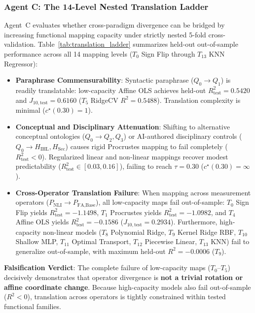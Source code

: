 \subsubsection{Agent C: The 14-Level Nested Translation Ladder}

Agent~C evaluates whether cross-paradigm divergence can be bridged by increasing functional mapping capacity under strictly nested 5-fold cross-validation. Table~\ref{tab:translation_ladder} summarizes held-out out-of-sample performance across all 14 mapping levels ($T_0$ Sign Flip through $T_{13}$ KNN Regressor):
\begin{itemize}
    \item \textbf{Paraphrase Commensurability}: Syntactic paraphrase ($Q_0 \to Q_1$) is readily translatable: low-capacity Affine OLS achieves held-out $R^2_{\text{test}} = 0.5420$ and $J_{10,\text{test}} = 0.6160$ ($T_5$ RidgeCV $R^2 = 0.5488$). Translation complexity is minimal ($c^\star(0.30) = 1$).
    \item \textbf{Conceptual and Disciplinary Attenuation}: Shifting to alternative conceptual ontologies ($Q_0 \to Q_2, Q_3$) or AI-authored disciplinary controls ($Q_0 \to H_{\text{IHL}}, H_{\text{Sec}}$) causes rigid Procrustes mapping to fail completely ($R^2_{\text{test}} < 0$). Regularized linear and non-linear mappings recover modest predictability ($R^2_{\text{test}} \in [0.03, 0.16]$), failing to reach $\tau = 0.30$ ($c^\star(0.30) = \infty$).
    \item \textbf{Cross-Operator Translation Failure}: When mapping across measurement operators ($P_{\text{NLI}} \to P_{\text{FA,Base}}$), all low-capacity maps fail out-of-sample: $T_0$ Sign Flip yields $R^2_{\text{test}} = -1.1498$, $T_1$ Procrustes yields $R^2_{\text{test}} = -1.0982$, and $T_4$ Affine OLS yields $R^2_{\text{test}} = -0.1586$ ($J_{10,\text{test}} = 0.2934$). Furthermore, high-capacity non-linear models ($T_8$ Polynomial Ridge, $T_9$ Kernel Ridge RBF, $T_{10}$ Shallow MLP, $T_{11}$ Optimal Transport, $T_{12}$ Piecewise Linear, $T_{13}$ KNN) fail to generalize out-of-sample, with maximum held-out $R^2 = -0.0006$ ($T_9$).
\end{itemize}
\textbf{Falsification Verdict}: The complete failure of low-capacity maps ($T_0$--$T_5$) decisively demonstrates that operator divergence is \textbf{not a trivial rotation or affine coordinate change}. Because high-capacity models also fail out-of-sample ($R^2 < 0$), translation across operators is tightly constrained within tested functional families.

